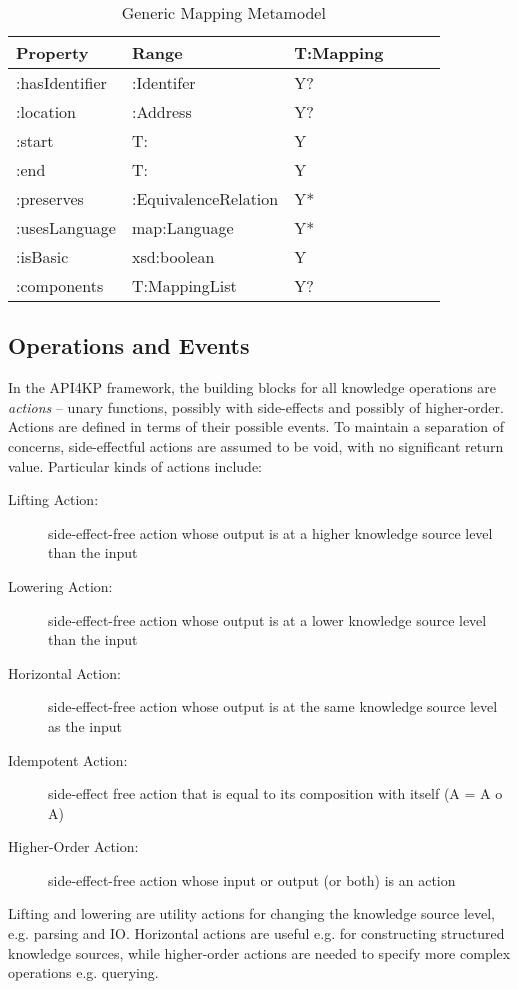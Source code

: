 \documentclass[runningheads]{llncs}
\begin{document}
\begin{table}[h]
\centering
\begin{tabular}{|l|l|l|l|l|l|}
 \hline
\textbf{Property} & \textbf{Range} & \textbf{T:Mapping}   \\ \hline
:hasIdentifier    & :Identifer     &  Y?                       \\ \hline
:location         & :Address       &  Y?                       \\ \hline
:start          & T:               &  Y                       \\ \hline
:end            & T:               &  Y                       \\ \hline
:preserves        & :EquivalenceRelation    &  Y*              \\ \hline
:usesLanguage     & map:Language    &  Y*              \\ \hline
:isBasic         & xsd:boolean     &  Y              \\ \hline
:components      & T:MappingList     &  Y?              \\ \hline
\end{tabular}
\caption{Generic Mapping Metamodel}
\label{krmaponto}
\end{table}

\subsection{Operations and Events}
\label{sec:op}

In the API4KP framework, the building blocks for all knowledge operations are \emph{actions} -- unary functions, possibly with side-effects and possibly of higher-order. Actions are defined in terms of their possible events. To maintain a separation of concerns, side-effectful actions are assumed to be void, with no significant return value. Particular kinds of actions include:

\begin{description}
      \item[Lifting Action:] side-effect-free action whose output is at a higher knowledge source level than the input
      \item[Lowering Action:]  side-effect-free action whose output is at a lower knowledge source level than the input
      \item[Horizontal Action:] side-effect-free action whose output is at the same knowledge source level as the input
      \item[Idempotent Action:] side-effect free action that is equal to its composition with itself (A = A o A)
      \item[Higher-Order Action:] side-effect-free action whose input or output (or both) is an action
\end{description}
Lifting and lowering are utility actions for changing the knowledge source level, e.g. parsing and IO. 
Horizontal actions are useful e.g. for constructing structured knowledge sources, while higher-order actions are needed to specify more complex operations e.g. querying.
\end{document}
